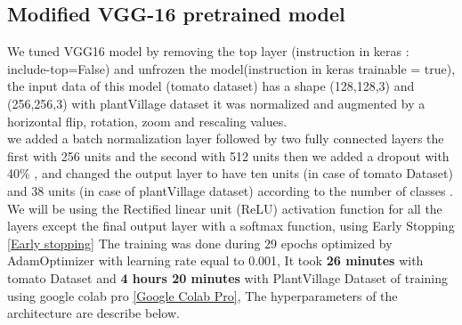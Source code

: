 \subsection{Modified VGG-16 pretrained model}
We tuned VGG16 model by removing the top layer (instruction in keras : include-top=False) and unfrozen the model(instruction in keras trainable = true),
the input data of this model (tomato dataset) has a shape (128,128,3) and
(256,256,3) with plantVillage dataset it was normalized and augmented by a horizontal flip, rotation, zoom and rescaling values.\\
we added a batch normalization layer followed by two fully connected layers the first with 256 units and the second with 512 units then we added a dropout with 40\% , 
and changed the output
layer to have ten units (in case of tomato Dataset) and 38 units (in case of plantVillage
dataset) according to the number of classes . We will be using the Rectified linear unit (ReLU)
activation function for all the layers except the final output layer with a softmax function, using Early Stopping \ref{Early stopping} The
training was done during 29 epochs optimized by AdamOptimizer with learning rate equal to 0.001, 
It took \textbf{26 minutes} with tomato Dataset and 
\textbf{4 hours 20 minutes} with PlantVillage Dataset of training using google colab pro \ref{Google Colab Pro}, 
The hyperparameters of the architecture are
describe below.\\

